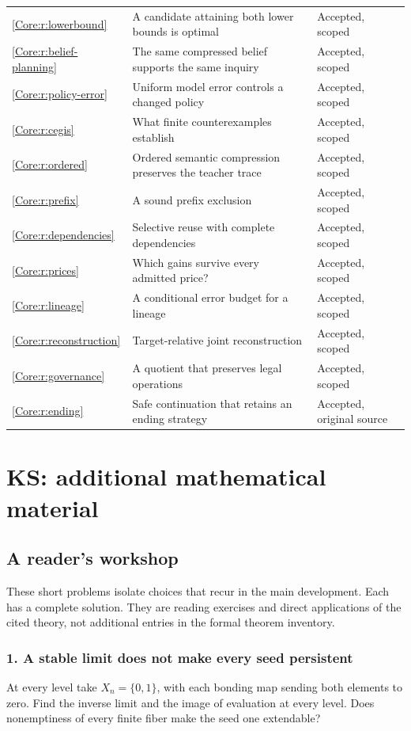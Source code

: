 \documentclass[11pt,oneside,openany]{book}
\newcommand{\chap}[1]{\section{#1}}
\numberwithin{equation}{section}
\begin{document}
\begin{longtable}{@{}p{.11\linewidth}p{.55\linewidth}p{.25\linewidth}@{}}
\ref{Core:r:lowerbound} & A candidate attaining both lower bounds is optimal & Accepted, scoped\\
\ref{Core:r:belief-planning} & The same compressed belief supports the same inquiry & Accepted, scoped\\
\ref{Core:r:policy-error} & Uniform model error controls a changed policy & Accepted, scoped\\
\ref{Core:r:cegis} & What finite counterexamples establish & Accepted, scoped\\
\ref{Core:r:ordered} & Ordered semantic compression preserves the teacher trace & Accepted, scoped\\
\ref{Core:r:prefix} & A sound prefix exclusion & Accepted, scoped\\
\ref{Core:r:dependencies} & Selective reuse with complete dependencies & Accepted, scoped\\
\ref{Core:r:prices} & Which gains survive every admitted price? & Accepted, scoped\\
\ref{Core:r:lineage} & A conditional error budget for a lineage & Accepted, scoped\\
\ref{Core:r:reconstruction} & Target-relative joint reconstruction & Accepted, scoped\\
\ref{Core:r:governance} & A quotient that preserves legal operations & Accepted, scoped\\
\ref{Core:r:ending} & Safe continuation that retains an ending strategy & Accepted, original source\\
\bottomrule
\end{longtable}\normalsize

\chapter{KS: additional mathematical material}
\setcounter{section}{0}



\chap{A reader's workshop}\label{KS:app:workshop}
These short problems isolate choices that recur in the main development. Each has a complete solution. They are reading exercises and direct applications of the cited theory, not additional entries in the formal theorem inventory.

\subsection*{1. A stable limit does not make every seed persistent}
At every level take \(X_n=\{0,1\}\), with each bonding map sending both elements to zero. Find the inverse limit and the image of evaluation at every level. Does nonemptiness of every finite fiber make the seed one extendable?
\end{document}
